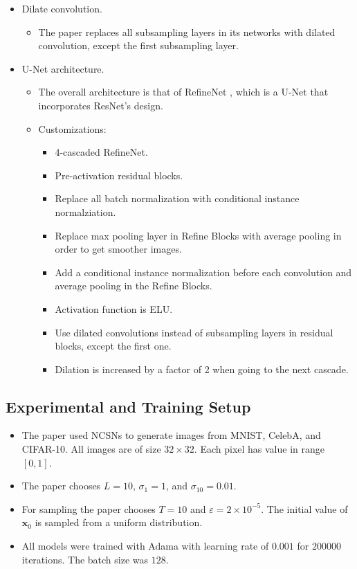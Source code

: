 \documentclass[10pt]{article}
\newcommand{\ve}[1]{\mathbf{#1}}
\begin{document}
\begin{itemize}
  \item Dilate convolution.
  \begin{itemize}
    \item The paper replaces all subsampling layers in its networks with dilated convolution, except the first subsampling layer.    
  \end{itemize}

  \item U-Net architecture.
  \begin{itemize}
    \item The overall architecture is that of RefineNet \cite{Lin:2016}, which is a U-Net that incorporates ResNet's design.
    
    \item Customizations:
    \begin{itemize}
      \item 4-cascaded RefineNet.
      \item Pre-activation residual blocks.
      \item Replace all batch normalization with conditional instance normalziation.
      \item Replace max pooling layer in Refine Blocks with average pooling in order to get smoother images.
      \item Add a conditional instance normalization before each convolution and average pooling in the Refine Blocks.
      \item Activation function is ELU.
      \item Use dilated convolutions instead of subsampling layers in residual blocks, except the first one.
      \item Dilation is increased by a factor of 2 when going to the next cascade.
    \end{itemize}
  \end{itemize}
\end{itemize}

\subsection{Experimental and Training Setup}

\begin{itemize}
  \item The paper used NCSNs to generate images from MNIST, CelebA, and CIFAR-10. All images are of size $32 \times 32$. Each pixel has value in range $[0,1]$.
  
  \item The paper chooses $L = 10$, $\sigma_1 = 1$, and $\sigma_10 = 0.01$.
  
  \item For sampling the paper chooses $T = 10$ and $\varepsilon = 2 \times 10^{-5}$. The initial value of $\ve{x}_0$ is sampled from a uniform distribution.
  
  \item All models were trained with Adama with learning rate of $0.001$ for $200000$ iterations. The batch size was $128$.
\end{itemize}


  
\end{document}
